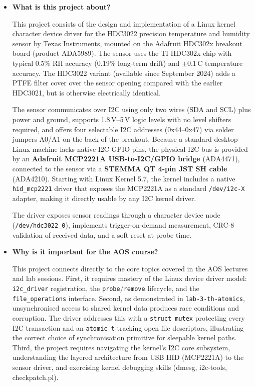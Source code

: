 \documentclass[10pt,a4]{article}
\begin{document}
\begin{itemize}
\item
\textbf{What is this project about?}

This project consists of the design and implementation of a Linux kernel character
device driver for the HDC3022 precision temperature and humidity sensor by Texas
Instruments, mounted on the Adafruit HDC302x breakout board (product ADA5989).
The sensor uses the TI HDC302x chip with typical 0.5\% RH accuracy (0.19\%
long-term drift) and $\pm$0.1\,\textdegree{}C temperature accuracy. The HDC3022
variant (available since September 2024) adds a PTFE filter cover over the sensor
opening compared with the earlier HDC3021, but is otherwise electrically identical.

The sensor communicates over I2C using only two wires (SDA and SCL) plus power
and ground, supports 1.8\,V--5\,V logic levels with no level shifters required, and
offers four selectable I2C addresses (0x44--0x47) via solder jumpers A0/A1 on the
back of the breakout. Because a standard desktop Linux machine lacks native I2C
GPIO pins, the physical I2C bus is provided by an \textbf{Adafruit MCP2221A
USB-to-I2C/GPIO bridge} (ADA4471), connected to the sensor via a \textbf{STEMMA QT
4-pin JST SH cable} (ADA4210). Starting with Linux Kernel 5.7, the kernel includes
a native \texttt{hid\_mcp2221} driver that exposes the MCP2221A as a standard
\texttt{/dev/i2c-X} adapter, making it directly usable by any I2C kernel driver.

The driver exposes sensor readings through a character device node
(\texttt{/dev/hdc3022\_0}), implements trigger-on-demand measurement, CRC-8
validation of received data, and a soft reset at probe time.

\item
\textbf{Why is it important for the AOS course?}

This project connects directly to the core topics covered in the AOS lectures and
lab sessions. First, it requires mastery of the Linux device driver model:
\texttt{i2c\_driver} registration, the \texttt{probe}/\texttt{remove} lifecycle,
and the \texttt{file\_operations} interface. Second, as demonstrated in
\texttt{lab-3-th-atomics}, unsynchronised access to shared kernel data produces
race conditions and corruption. The driver addresses this with a \texttt{struct mutex}
protecting every I2C transaction and an \texttt{atomic\_t} tracking open file
descriptors, illustrating the correct choice of synchronisation primitive for
sleepable kernel paths. Third, the project requires navigating the kernel's I2C
core subsystem, understanding the layered architecture from USB HID (MCP2221A) to
the sensor driver, and exercising kernel debugging skills (dmesg, i2c-tools,
checkpatch.pl).
\end{itemize}
\end{document}

